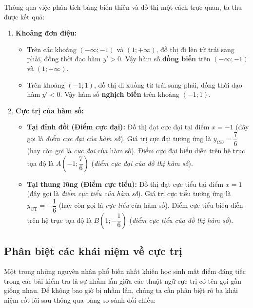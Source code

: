 \documentclass[12pt]{article}
\begin{document}
	\begin{loigiai}
		Thông qua việc phân tích bảng biến thiên và đồ thị một cách trực quan, ta thu được kết quả:
		\begin{enumerate}[label=\alph*)]
			\item \textbf{Khoảng đơn điệu:}
			\begin{itemize}
				\item Trên các khoảng $(-\infty; -1)$ và $(1; +\infty)$, đồ thị đi lên từ trái sang phải, đồng thời đạo hàm $y' > 0$. Vậy hàm số \textbf{đồng biến} trên $(-\infty; -1)$ và $(1; +\infty)$.
				\item Trên khoảng $(-1; 1)$, đồ thị đi xuống từ trái sang phải, đồng thời đạo hàm $y' < 0$. Vậy hàm số \textbf{nghịch biến} trên khoảng $(-1; 1)$.
			\end{itemize}
			
			\item \textbf{Cực trị của hàm số:}
			\begin{itemize}
				\item \textbf{Tại đỉnh đồi (Điểm cực đại):} Đồ thị đạt cực đại tại điểm $x = -1$ (đây gọi là \textit{điểm cực đại của hàm số}). Giá trị cực đại tương ứng là $y_{\text{CĐ}} = \dfrac{7}{6}$ (hay còn gọi là \textit{cực đại} của hàm số). Điểm cực đại biểu diễn trên hệ trục tọa độ là $A\left(-1; \dfrac{7}{6}\right)$ (\textit{điểm cực đại của đồ thị hàm số}).
				
				\item \textbf{Tại thung lũng (Điểm cực tiểu):} Đồ thị đạt cực tiểu tại điểm $x = 1$ (đây gọi là \textit{điểm cực tiểu của hàm số}). Giá trị cực tiểu tương ứng là $y_{\text{CT}} = -\dfrac{1}{6}$ (hay còn gọi là \textit{cực tiểu} của hàm số). Điểm cực tiểu biểu diễn trên hệ trục tọa độ là $B\left(1; -\dfrac{1}{6}\right)$ (\textit{điểm cực tiểu của đồ thị hàm số}).
			\end{itemize}
		\end{enumerate}
	\end{loigiai}
	
	
	\subsection{Phân biệt các khái niệm về cực trị}
	
	Một trong những nguyên nhân phổ biến nhất khiến học sinh mất điểm đáng tiếc trong các bài kiểm tra là sự nhầm lẫn giữa các thuật ngữ cực trị có tên gọi gần giống nhau. Để không bao giờ bị nhầm lẫn, chúng ta cần phân biệt rõ ba khái niệm cốt lõi sau thông qua bảng so sánh đối chiếu:
	
\end{document}
